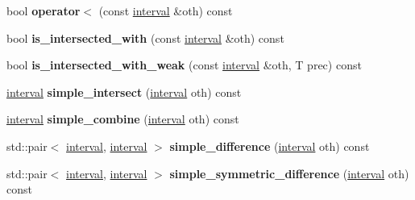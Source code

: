 \begin{DoxyCompactItemize}
\item 
bool {\bfseries operator$<$} (const \hyperlink{classgxx_1_1math_1_1interval}{interval} \&oth) const \hypertarget{classgxx_1_1math_1_1interval_ac5cbf3a84bb47d0265b2e95de0469868}{}\label{classgxx_1_1math_1_1interval_ac5cbf3a84bb47d0265b2e95de0469868}

\item 
bool {\bfseries is\+\_\+intersected\+\_\+with} (const \hyperlink{classgxx_1_1math_1_1interval}{interval} \&oth) const \hypertarget{classgxx_1_1math_1_1interval_a44796ebc0de0bfccdcdd0810225f39b1}{}\label{classgxx_1_1math_1_1interval_a44796ebc0de0bfccdcdd0810225f39b1}

\item 
bool {\bfseries is\+\_\+intersected\+\_\+with\+\_\+weak} (const \hyperlink{classgxx_1_1math_1_1interval}{interval} \&oth, T prec) const \hypertarget{classgxx_1_1math_1_1interval_a39812f98a7c9748f73768aa7793a1a4e}{}\label{classgxx_1_1math_1_1interval_a39812f98a7c9748f73768aa7793a1a4e}

\item 
\hyperlink{classgxx_1_1math_1_1interval}{interval} {\bfseries simple\+\_\+intersect} (\hyperlink{classgxx_1_1math_1_1interval}{interval} oth) const \hypertarget{classgxx_1_1math_1_1interval_afae49443e9f60e7f2014f409bd1bbdf3}{}\label{classgxx_1_1math_1_1interval_afae49443e9f60e7f2014f409bd1bbdf3}

\item 
\hyperlink{classgxx_1_1math_1_1interval}{interval} {\bfseries simple\+\_\+combine} (\hyperlink{classgxx_1_1math_1_1interval}{interval} oth) const \hypertarget{classgxx_1_1math_1_1interval_ac0fce51ce09bf944b42a5076cedae851}{}\label{classgxx_1_1math_1_1interval_ac0fce51ce09bf944b42a5076cedae851}

\item 
std\+::pair$<$ \hyperlink{classgxx_1_1math_1_1interval}{interval}, \hyperlink{classgxx_1_1math_1_1interval}{interval} $>$ {\bfseries simple\+\_\+difference} (\hyperlink{classgxx_1_1math_1_1interval}{interval} oth) const \hypertarget{classgxx_1_1math_1_1interval_a9c2c4f0d560c0a3e9642b1b5859eee1b}{}\label{classgxx_1_1math_1_1interval_a9c2c4f0d560c0a3e9642b1b5859eee1b}

\item 
std\+::pair$<$ \hyperlink{classgxx_1_1math_1_1interval}{interval}, \hyperlink{classgxx_1_1math_1_1interval}{interval} $>$ {\bfseries simple\+\_\+symmetric\+\_\+difference} (\hyperlink{classgxx_1_1math_1_1interval}{interval} oth) const \hypertarget{classgxx_1_1math_1_1interval_ae48bb2d429ed5a8c1d31672d9d60b441}{}\label{classgxx_1_1math_1_1interval_ae48bb2d429ed5a8c1d31672d9d60b441}


\end{DoxyCompactItemize}
